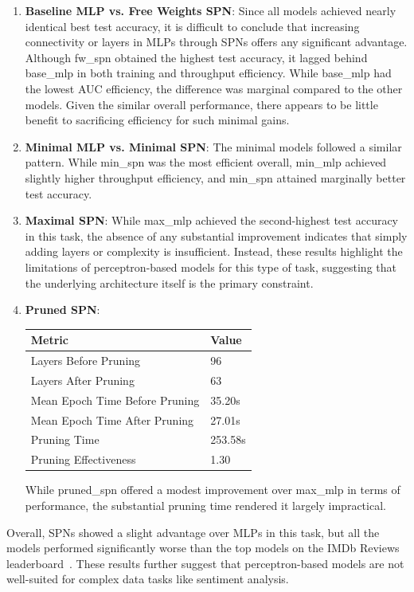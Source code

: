 \begin{enumerate}
\item \textbf{Baseline MLP vs. Free Weights SPN}: Since all models achieved nearly identical best test accuracy, it is difficult to conclude that increasing connectivity or layers in MLPs through SPNs offers any significant advantage. Although fw\_spn obtained the highest test accuracy, it lagged behind base\_mlp in both training and throughput efficiency. While base\_mlp had the lowest AUC efficiency, the difference was marginal compared to the other models. Given the similar overall performance, there appears to be little benefit to sacrificing efficiency for such minimal gains.
\item \textbf{Minimal MLP vs. Minimal SPN}: The minimal models followed a similar pattern. While min\_spn was the most efficient overall, min\_mlp achieved slightly higher throughput efficiency, and min\_spn attained marginally better test accuracy.
\item \textbf{Maximal SPN}: While max\_mlp achieved the second-highest test accuracy in this task, the absence of any substantial improvement indicates that simply adding layers or complexity is insufficient. Instead, these results highlight the limitations of perceptron-based models for this type of task, suggesting that the underlying architecture itself is the primary constraint.
\item \textbf{Pruned SPN}:
\begin{center}  %
\begin{tabular}{|l|l|}
\hline
\textbf{Metric} & \textbf{Value} \\
\hline
Layers Before Pruning & 96 \\
Layers After Pruning & 63 \\
Mean Epoch Time Before Pruning & 35.20s \\
Mean Epoch Time After Pruning & 27.01s \\
Pruning Time & 253.58s \\
Pruning Effectiveness & 1.30 \\
\hline
\end{tabular}
\end{center}

While pruned\_spn offered a modest improvement over max\_mlp in terms of performance, the substantial pruning time rendered it largely impractical.

\end{enumerate}

Overall, SPNs showed a slight advantage over MLPs in this task, but all the models performed significantly worse than the top models on the IMDb Reviews leaderboard~\cite{pwc_imdb_sota}. These results further suggest that perceptron-based models are not well-suited for complex data tasks like sentiment analysis.

